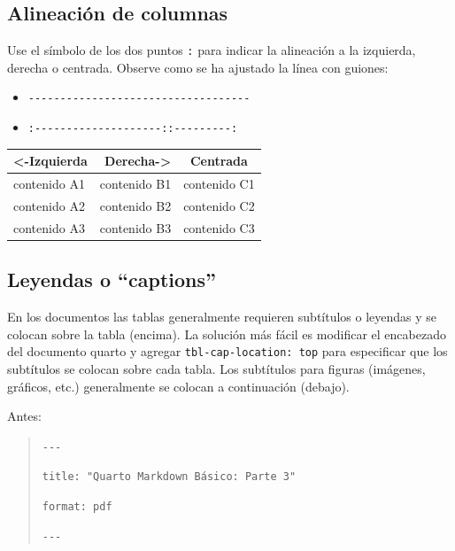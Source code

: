 \documentclass[
  letterpaper,
  DIV=11,
  numbers=noendperiod]{scrartcl}
\providecommand{\tightlist}{%
  \setlength{\itemsep}{0pt}\setlength{\parskip}{0pt}}\usepackage{longtable,booktabs,array}
\begin{document}
\subsection{Alineación de columnas}\label{alineaciuxf3n-de-columnas}

Use el símbolo de los dos puntos \texttt{:} para indicar la alineación a
la izquierda, derecha o centrada. Observe como se ha ajustado la línea
con guiones:

\begin{itemize}
\tightlist
\item
  \texttt{\textbar{}-\/-\/-\/-\/-\/-\/-\/-\/-\/-\/-\/-\/-\/-\/-\/-\/-\/-\/-\/-\/-\/-\/-\/-\/-\/-\/-\/-\/-\/-\/-\/-\/-\/-\/-\textbar{}}
\item
  \texttt{\textbar{}:-\/-\/-\/-\/-\/-\/-\/-\/-\/-\textbar{}-\/-\/-\/-\/-\/-\/-\/-\/-\/-:\textbar{}:-\/-\/-\/-\/-\/-\/-\/-\/-:\textbar{}}
\end{itemize}

\begin{longtable}[]{@{}lrc@{}}
\toprule\noalign{}
\textless-Izquierda & Derecha-\textgreater{} & Centrada \\
\midrule\noalign{}
\endhead
\bottomrule\noalign{}
\endlastfoot
contenido A1 & contenido B1 & contenido C1 \\
contenido A2 & contenido B2 & contenido C2 \\
contenido A3 & contenido B3 & contenido C3 \\
\end{longtable}

\subsection{Leyendas o ``captions''}\label{leyendas-o-captions}

En los documentos las tablas generalmente requieren subtítulos o
leyendas y se colocan sobre la tabla (encima). La solución más fácil es
modificar el encabezado del documento quarto y agregar
\texttt{tbl-cap-location:\ top} para especificar que los subtítulos se
colocan sobre cada tabla. Los subtítulos para figuras (imágenes,
gráficos, etc.) generalmente se colocan a continuación (debajo).

Antes:

\begin{quote}
\texttt{-\/-\/-}

\texttt{title:\ "Quarto\ Markdown\ Básico:\ Parte\ 3"}

\texttt{format:\ pdf}

\texttt{-\/-\/-}
\end{quote}
\end{document}
